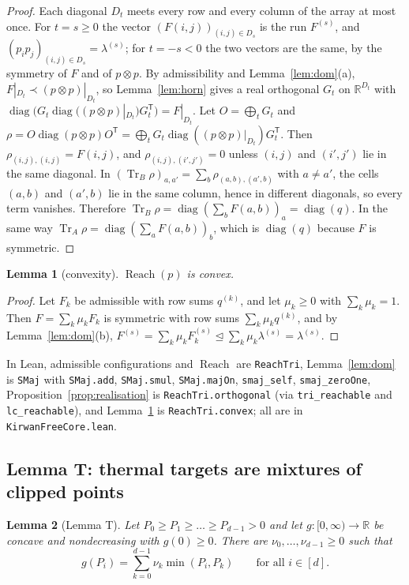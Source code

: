 \documentclass[11pt]{amsart}
\newtheorem{lemma}{Lemma}[section]
\theoremstyle{definition}
\theoremstyle{remark}
\numberwithin{equation}{section}
\newcommand{\R}{\mathbb{R}}
\newcommand{\Tr}{\operatorname{Tr}}
\newcommand{\diag}{\operatorname{diag}}
\newcommand{\Reach}{\operatorname{Reach}}
\newcommand{\dom}{\trianglelefteq}
\newcommand{\lean}[1]{\texttt{#1}}
\begin{document}
\begin{proof}
Each diagonal $D_t$ meets every row and every column of the array at most once. For $t=s\ge0$ the
vector $(F(i,j))_{(i,j)\in D_s}$ is the run $F^{(s)}$, and $(p_ip_j)_{(i,j)\in D_s}=\lambda^{(s)}$; for
$t=-s<0$ the two vectors are the same, by the symmetry of $F$ and of $p\otimes p$. By admissibility
and Lemma~\ref{lem:dom}(a), $F|_{D_t}\prec(p\otimes p)|_{D_t}$, so Lemma~\ref{lem:horn} gives a real
orthogonal $G_t$ on $\R^{D_t}$ with $\diag(G_t\diag((p\otimes p)|_{D_t})G_t^{\mathsf T})=F|_{D_t}$. Let
$O=\bigoplus_tG_t$ and $\rho=O\diag(p\otimes p)O^{\mathsf T}=\bigoplus_tG_t\diag((p\otimes p)|_{D_t})G_t^{\mathsf T}$.
Then $\rho_{(i,j),(i,j)}=F(i,j)$, and $\rho_{(i,j),(i',j')}=0$ unless $(i,j)$ and $(i',j')$ lie in the same
diagonal. In $(\Tr_B\rho)_{a,a'}=\sum_b\rho_{(a,b),(a',b)}$ with $a\ne a'$, the cells $(a,b)$ and $(a',b)$
lie in the same column, hence in different diagonals, so every term vanishes. Therefore
$\Tr_B\rho=\diag(\sum_bF(a,b))_a=\diag(q)$. In the same way
$\Tr_A\rho=\diag(\sum_aF(a,b))_b$, which is $\diag(q)$ because $F$ is symmetric.
\end{proof}

\begin{lemma}[convexity]\label{lem:convex}
$\Reach(p)$ is convex.
\end{lemma}

\begin{proof}
Let $F_k$ be admissible with row sums $q^{(k)}$, and let $\mu_k\ge0$ with $\sum_k\mu_k=1$. Then
$F=\sum_k\mu_kF_k$ is symmetric with row sums $\sum_k\mu_kq^{(k)}$, and by Lemma~\ref{lem:dom}(b),
$F^{(s)}=\sum_k\mu_kF_k^{(s)}\dom\sum_k\mu_k\lambda^{(s)}=\lambda^{(s)}$.
\end{proof}

In Lean, admissible configurations and $\Reach$ are \lean{ReachTri}, Lemma~\ref{lem:dom} is
\lean{SMaj} with \lean{SMaj.add}, \lean{SMaj.smul}, \lean{SMaj.majOn}, \lean{smaj\_self},
\lean{smaj\_zeroOne}, Proposition~\ref{prop:realisation} is \lean{ReachTri.orthogonal} (via
\lean{tri\_reachable} and \lean{lc\_reachable}), and Lemma~\ref{lem:convex} is \lean{ReachTri.convex};
all are in \lean{KirwanFreeCore.lean}.

\subsection{Lemma T: thermal targets are mixtures of clipped points}

\begin{lemma}[Lemma T]\label{lem:T}
Let $P_0\ge P_1\ge\dots\ge P_{d-1}>0$ and let $g:[0,\infty)\to\R$ be concave and nondecreasing with
$g(0)\ge0$. There are $\nu_0,\dots,\nu_{d-1}\ge0$ such that
\[
  g(P_i)=\sum_{k=0}^{d-1}\nu_k\min(P_i,P_k)\qquad\text{for all }i\in[d] .
\]
\end{lemma}
\end{document}
